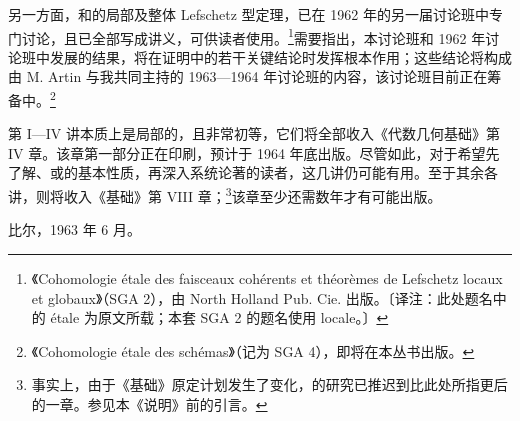 另一方面，和的局部及整体 Lefschetz 型定理，已在 1962 年的另一届讨论班中专门讨论，且已全部写成讲义，可供读者使用。\footnote{《Cohomologie étale des faisceaux cohérents et théorèmes de Lefschetz locaux et globaux》（SGA 2），由 North Holland Pub. Cie. 出版。〔译注：此处题名中的 étale 为原文所载；本套 SGA 2 的题名使用 locale。〕}需要指出，本讨论班和 1962 年讨论班中发展的结果，将在证明中的若干关键结论时发挥根本作用；这些结论将构成由 M. Artin 与我共同主持的 1963—1964 年讨论班的内容，该讨论班目前正在筹备中。\footnote{《Cohomologie étale des schémas》（记为 SGA 4），即将在本丛书出版。}

第 I—IV 讲本质上是局部的，且非常初等，它们将全部收入《代数几何基础》第 IV 章。该章第一部分正在印刷，预计于 1964 年底出版。尽管如此，对于希望先了解、或的基本性质，再深入系统论著的读者，这几讲仍可能有用。至于其余各讲，则将收入《基础》第 VIII 章；\footnote{事实上，由于《基础》原定计划发生了变化，的研究已推迟到比此处所指更后的一章。参见本《说明》前的引言。}该章至少还需数年才有可能出版。

\begin{flushright}比尔，1963 年 6 月。\end{flushright}
